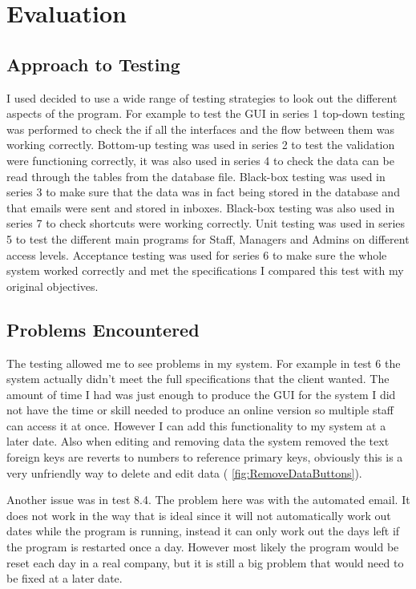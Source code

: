 \section{Evaluation}

\subsection{Approach to Testing}

I used decided to use a wide range of testing strategies to look out the different aspects of the program. For example to test the GUI in series 1 top-down testing was performed to check the if all the interfaces and the flow between them was working correctly. Bottom-up testing was used in series 2 to test the validation were functioning correctly, it was also used in series 4 to check the data can be read through the tables from the database file. Black-box testing was used in series 3 to make sure that the data was in fact being stored in the database and that emails were sent and stored in inboxes. Black-box testing was also used in series 7 to check shortcuts were working correctly. Unit testing was used in series 5 to test the different main programs for Staff, Managers and Admins on different access levels. Acceptance testing was used for series 6 to make sure the whole system worked correctly and met the specifications I compared this test with my original objectives.

\subsection{Problems Encountered}

The testing allowed me to see problems in my system. For example in test 6 the system actually didn't meet the full specifications that the client wanted. The amount of time I had was just enough to produce the GUI for the system I did not have the time or skill needed to produce an online version so multiple staff can access it at once. However I can add this functionality to my system at a later date. Also when editing and removing data the system removed the text foreign keys are reverts to numbers to reference primary keys, obviously this is a very unfriendly way to delete and edit data ( \ref{fig:RemoveDataButtons}).

\par Another issue was in test 8.4. The problem here was with the automated email. It does not work in the way that is ideal since it will not automatically work out dates while the program is running, instead it can only work out the days left if the program is restarted once a day. However most likely the program would be reset each day in a real company, but it is still a big problem that would need to be fixed at a later date.

